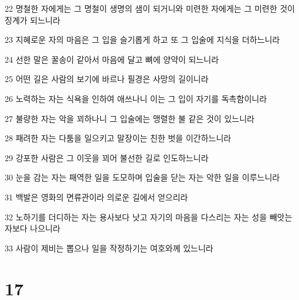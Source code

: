 \par 22 명철한 자에게는 그 명철이 생명의 샘이 되거니와 미련한 자에게는 그 미련한 것이 징계가 되느니라
\par 23 지혜로운 자의 마음은 그 입을 슬기롭게 하고 또 그 입술에 지식을 더하느니라
\par 24 선한 말은 꿀송이 같아서 마음에 달고 뼈에 양약이 되느니라
\par 25 어떤 길은 사람의 보기에 바르나 필경은 사망의 길이니라
\par 26 노력하는 자는 식욕을 인하여 애쓰나니 이는 그 입이 자기를 독촉함이니라
\par 27 불량한 자는 악을 꾀하나니 그 입술에는 맹렬한 불 같은 것이 있느니라
\par 28 패려한 자는 다툼을 일으키고 말장이는 친한 벗을 이간하느니라
\par 29 강포한 사람은 그 이웃을 꾀어 불선한 길로 인도하느니라
\par 30 눈을 감는 자는 패역한 일을 도모하며 입술을 닫는 자는 악한 일을 이루느니라
\par 31 백발은 영화의 면류관이라 의로운 길에서 얻으리라
\par 32 노하기를 더디하는 자는 용사보다 낫고 자기의 마음을 다스리는 자는 성을 빼앗는 자보다 나으니라
\par 33 사람이 제비는 뽑으나 일을 작정하기는 여호와께 있느니라

\chapter{17}

